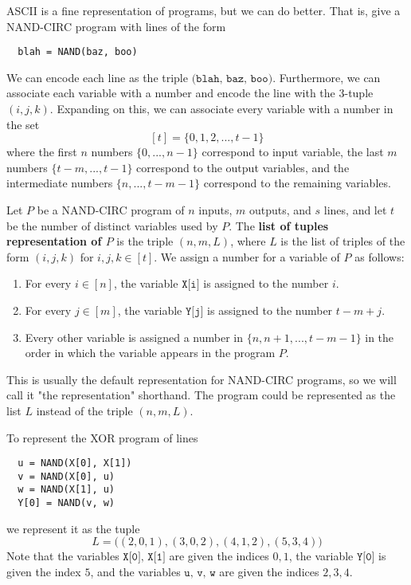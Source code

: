   ASCII is a fine representation of programs, but we can do better. That is, give a NAND-CIRC program with lines of the form 
  \begin{lstlisting}
  blah = NAND(baz, boo)
  \end{lstlisting}
  We can encode each line as the triple $\texttt{(blah, baz, boo)}$. Furthermore, we can associate each variable with a number and encode the line with the 3-tuple $(i, j, k)$. Expanding on this, we can associate every variable with a number in the set
  \[[t] = \{0, 1, 2, ..., t-1\}\]
  where the first $n$ numbers $\{0, ..., n-1\}$ correspond to input variable, the last $m$ numbers $\{t-m, ..., t-1\}$ correspond to the output variables, and the intermediate numbers $\{n, ..., t-m-1\}$ correspond to the remaining variables. 

  \begin{definition}
  Let $P$ be a NAND-CIRC program of $n$ inputs, $m$ outputs, and $s$ lines, and let $t$ be the number of distinct variables used by $P$. The \textbf{list of tuples representation of $P$} is the triple $(n, m, L)$, where $L$ is the list of triples of the form $(i, j, k)$ for $i, j, k \in [t]$. We assign a number for a variable of $P$ as follows:
  \begin{enumerate}
      \item For every $i \in [n]$, the variable $\texttt{X[i]}$ is assigned to the number $i$. 
      \item For every $j \in [m]$, the variable $\texttt{Y[j]}$ is assigned to the number $t - m + j$.
      \item Every other variable is assigned a number in $\{n, n+1, ..., t-m-1\}$ in the order in which the variable appears in the program $P$. 
  \end{enumerate}
  This is usually the default representation for NAND-CIRC programs, so we will call it "the representation" shorthand. The program could be represented as the list $L$ instead of the triple $(n, m, L)$. 
  \end{definition}

  \begin{example}
  To represent the XOR program of lines 
  \begin{lstlisting}
  u = NAND(X[0], X[1])
  v = NAND(X[0], u) 
  w = NAND(X[1], u)
  Y[0] = NAND(v, w)
  \end{lstlisting}
  we represent it as the tuple 
  \[L = \big( (2, 0, 1), (3, 0, 2), (4, 1, 2), (5, 3, 4)\big) \]
  Note that the variables $\texttt{X[0], X[1]}$ are given the indices $0, 1$, the variable $\texttt{Y[0]}$ is given the index $5$, and the variables $\texttt{u, v, w}$ are given the indices $2, 3, 4$. 
  \end{example}

